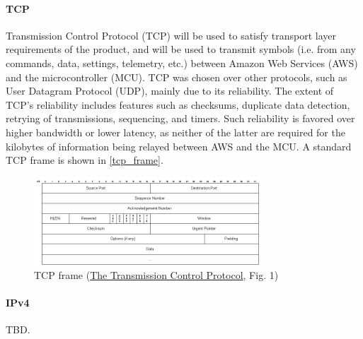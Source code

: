 \paragraph{TCP} \label{tcp_standard} Transmission Control Protocol (TCP) will be used to satisfy transport layer
requirements of the product, and will be used to transmit symbols (i.e.
from any commands, data, settings, telemetry, etc.) between Amazon Web
Services (AWS) and the microcontroller (MCU). TCP was chosen over other
protocols, such as User Datagram Protocol (UDP), mainly due to its
reliability. The extent of TCP's reliability includes features such as
checksums, duplicate data detection, retrying of transmissions, sequencing,
and timers.
Such reliability is favored over higher bandwidth or lower
latency, as neither of the latter are required for the kilobytes
of information being relayed between AWS and the MCU. A standard TCP frame
is shown in \autoref{tcp_frame}.
\begin{figure}[H]
    \caption{TCP frame (\href{https://condor.depaul.edu/jkristof/technotes/tcp.html}{The Transmission Control Protocol}, Fig. 1)}
    \label{tcp_frame}
    \centering
    \includegraphics[width=0.75\textwidth]{images/tcp_frame.jpg}
\end{figure}

\paragraph{IPv4} TBD. 



